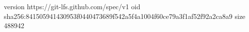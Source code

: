 version https://git-lfs.github.com/spec/v1
oid sha256:841505941430953f0440473689f542a5f4a1004f60ce79a3f1af52f92a2ca8a9
size 488942
